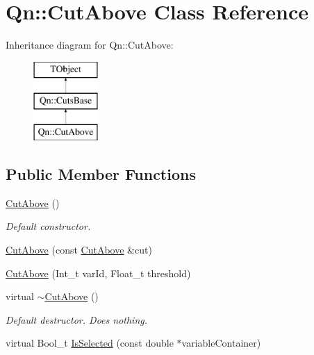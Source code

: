 \hypertarget{classQn_1_1CutAbove}{}\section{Qn\+:\+:Cut\+Above Class Reference}
\label{classQn_1_1CutAbove}
Inheritance diagram for Qn\+:\+:Cut\+Above\+:\begin{figure}[H]
\begin{center}
\leavevmode
\includegraphics[height=3.000000cm]{classQn_1_1CutAbove}
\end{center}
\end{figure}
\subsection*{Public Member Functions}
\begin{DoxyCompactItemize}
\item 
\mbox{\label{classQn_1_1CutAbove_a44c73d2c99b1ca30f53551d9bcb755e8}} 
\mbox{\hyperlink{classQn_1_1CutAbove_a44c73d2c99b1ca30f53551d9bcb755e8}{Cut\+Above}} ()
\begin{DoxyCompactList}\small\item\em Default constructor. \end{DoxyCompactList}\item 
\mbox{\hyperlink{classQn_1_1CutAbove_a8921d1babf244944f2c5ca072fd68489}{Cut\+Above}} (const \mbox{\hyperlink{classQn_1_1CutAbove}{Cut\+Above}} \&cut)
\item 
\mbox{\hyperlink{classQn_1_1CutAbove_aa5586d4101ac6cd2720e2b1bdb608132}{Cut\+Above}} (Int\+\_\+t var\+Id, Float\+\_\+t threshold)
\item 
\mbox{\label{classQn_1_1CutAbove_a2fab5ec0fa45bdd7d1ae52667a370857}} 
virtual \mbox{\hyperlink{classQn_1_1CutAbove_a2fab5ec0fa45bdd7d1ae52667a370857}{$\sim$\+Cut\+Above}} ()
\begin{DoxyCompactList}\small\item\em Default destructor. Does nothing. \end{DoxyCompactList}\item 
virtual Bool\+\_\+t \mbox{\hyperlink{classQn_1_1CutAbove_a2d7ecca87d2d0c50724d795715f5cedd}{Is\+Selected}} (const double $\ast$variable\+Container)
\end{DoxyCompactItemize}
